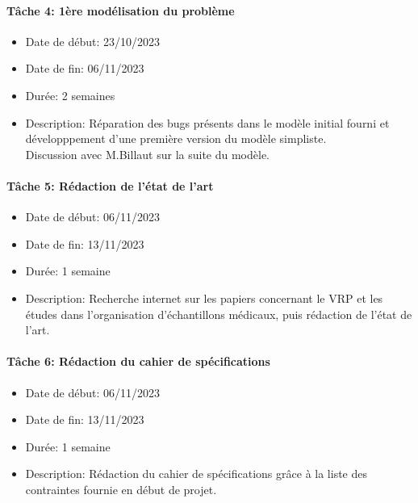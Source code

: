 \documentclass{polytech/polytech}
\numberwithin{figure}{chapter}
\begin{document}
\begin{appendix}
\begin{itemize}
\end{itemize}

\paragraph{Tâche 4: 1ère modélisation du problème}

\begin{itemize}
    \item Date de début: 23/10/2023
    \item Date de fin: 06/11/2023
    \item Durée: 2 semaines
    \item
        Description: Réparation des bugs présents dans le modèle initial fourni et développpement d'une première version du modèle simpliste.\\
        Discussion avec M.Billaut sur la suite du modèle.
\end{itemize}

\paragraph{Tâche 5: Rédaction de l'état de l'art}

\begin{itemize}
    \item Date de début: 06/11/2023
    \item Date de fin: 13/11/2023
    \item Durée: 1 semaine
    \item
        Description: Recherche internet sur les papiers concernant le VRP et les études dans l'organisation d'échantillons médicaux, puis rédaction de l'état de l'art.
\end{itemize}

\paragraph{Tâche 6: Rédaction du cahier de spécifications}

\begin{itemize}
    \item Date de début: 06/11/2023
    \item Date de fin: 13/11/2023
    \item Durée: 1 semaine
    \item
        Description: Rédaction du cahier de spécifications grâce à la liste des contraintes fournie en début de projet.
\end{itemize}


\end{appendix}
\end{document}
